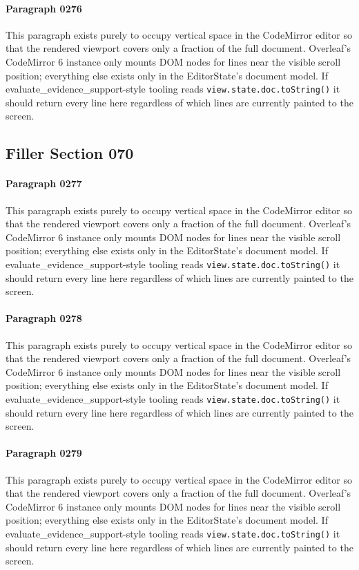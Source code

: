 \documentclass{article}
\begin{document}
\paragraph{Paragraph 0276}
This paragraph exists purely to occupy vertical space in the CodeMirror editor so that the rendered viewport covers only a fraction of the full document. Overleaf's CodeMirror 6 instance only mounts DOM nodes for lines near the visible scroll position; everything else exists only in the EditorState's document model. If evaluate\_evidence\_support-style tooling reads \texttt{view.state.doc.toString()} it should return every line here regardless of which lines are currently painted to the screen.

\subsection{Filler Section 070}
\paragraph{Paragraph 0277}
This paragraph exists purely to occupy vertical space in the CodeMirror editor so that the rendered viewport covers only a fraction of the full document. Overleaf's CodeMirror 6 instance only mounts DOM nodes for lines near the visible scroll position; everything else exists only in the EditorState's document model. If evaluate\_evidence\_support-style tooling reads \texttt{view.state.doc.toString()} it should return every line here regardless of which lines are currently painted to the screen.

\paragraph{Paragraph 0278}
This paragraph exists purely to occupy vertical space in the CodeMirror editor so that the rendered viewport covers only a fraction of the full document. Overleaf's CodeMirror 6 instance only mounts DOM nodes for lines near the visible scroll position; everything else exists only in the EditorState's document model. If evaluate\_evidence\_support-style tooling reads \texttt{view.state.doc.toString()} it should return every line here regardless of which lines are currently painted to the screen.

\paragraph{Paragraph 0279}
This paragraph exists purely to occupy vertical space in the CodeMirror editor so that the rendered viewport covers only a fraction of the full document. Overleaf's CodeMirror 6 instance only mounts DOM nodes for lines near the visible scroll position; everything else exists only in the EditorState's document model. If evaluate\_evidence\_support-style tooling reads \texttt{view.state.doc.toString()} it should return every line here regardless of which lines are currently painted to the screen.
\end{document}
